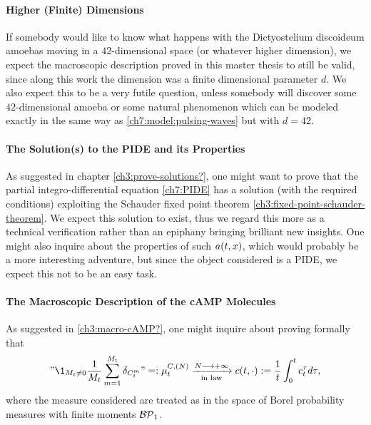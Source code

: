 \paragraph{Higher (Finite) Dimensions}
If somebody would like to know what happens with the Dictyostelium discoideum amoebas moving in a $42$-dimensional space (or whatever higher dimension), we expect the macroscopic description proved in this master thesis to still be valid, since along this work the dimension was a finite dimensional parameter $d$. 
We also expect this to be a very futile question, unless somebody will discover some $42$-dimensional amoeba or some natural phenomenon which can be modeled exactly in the same way as \ref{ch7:model:pulsing-waves} but with $d=42$.

\paragraph{The Solution(s) to the PIDE and its Properties}
As suggested in chapter \ref{ch3:prove-solutions?}, one might want to prove that the partial integro-differential equation \ref{ch7:PIDE} has a solution (with the required conditions) exploiting the Schauder fixed point theorem \ref{ch3:fixed-point-schauder-theorem}.
We expect this solution to exist, thus we regard this more as a technical verification rather than an epiphany bringing brilliant new insights.
One might also inquire about the properties of such $a(t, x)$, which would probably be a more interesting adventure, but since the object considered is a PIDE, we expect this not to be an easy task.

\paragraph{The Macroscopic Description of the cAMP Molecules}
As suggested in \ref{ch3:macro-cAMP?}, one might inquire about proving formally that
\begin{equation*}
	"\1_{\hmactive_t \neq 0} \frac{1}{\hmactive_t}\sum_{m=1}^{\hmactive_t} \delta_{\camp_t^m} " =: \empmeas_t^{\camp,(N)} 
	\xrightarrow[\text{in law}]{N\longrightarrow +\infty} 
	\cdens(t,\cdot) :=
	\frac{1}{t}
	\int_0^t 
	\cdens_t^\tau 
	d \tau,
\end{equation*}
where the measure considered are treated as \rv in the space of Borel probability measures with finite moments $\mathcal{BP}_1$.